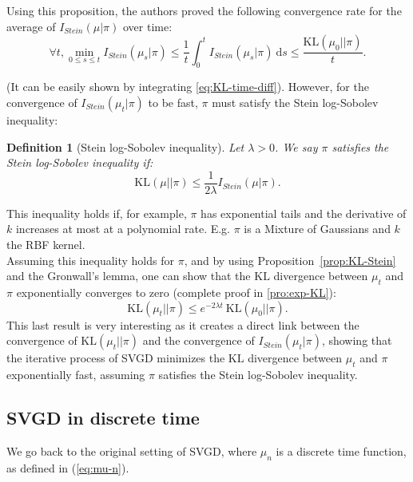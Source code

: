 \documentclass{article}
\newcommand{\KL}{\mathrm{KL}}
\renewcommand{\d}{\: \mathrm{d}}
\newcommand{\Stein}{I_{Stein}(\mu | \pi)}
\newtheorem{definition}{Definition}
\begin{document}
Using this proposition, the authors proved the following convergence rate
for the average of $\Stein$ over time:
\begin{equation}
  \forall t, \min_{0 \leq s \leq t} I_{Stein}(\mu_s | \pi)
    \leq \frac{1}{t} \int_0^t I_{Stein}(\mu_s | \pi) \d s
    \leq \frac{\KL(\mu_0 || \pi)}{t}.
  \label{eq:convergence-avg-stein}
\end{equation}

(It can be easily shown by integrating \ref{eq:KL-time-diff}).
However, for the convergence of $I_{Stein}(\mu_t | \pi)$ to be fast,
$\pi$ must satisfy the Stein log-Sobolev inequality:

\begin{definition}[Stein log-Sobolev inequality]\label{def:stein-log-Sobolev}
  Let $\lambda > 0$. We say $\pi$ satisfies the Stein log-Sobolev inequality if:
  $$
  \KL(\mu || \pi) \leq \frac{1}{2 \lambda} \Stein.
  $$
\end{definition}
\noindent
This inequality holds if, for example, $\pi$ has exponential tails and the derivative of $k$
increases at most at a polynomial rate. E.g. $\pi$ is a Mixture of Gaussians
and $k$ the RBF kernel.\\
Assuming this inequality holds for $\pi$, and by using Proposition~\ref{prop:KL-Stein}
and the Gronwall's lemma,
one can show that the $\KL$ divergence between $\mu_t$ and $\pi$ exponentially
converges to zero (complete proof in \ref{pro:exp-KL}):
\begin{equation}
  \KL(\mu_t || \pi) \leq e^{-2 \lambda t} \: \KL(\mu_0 || \pi).
  \label{eq:exp-KL}
\end{equation}
This last result is very interesting as it creates a direct link between the
convergence of $\KL(\mu_t || \pi)$ and the convergence
of $I_{Stein}(\mu_t | \pi)$, showing that the iterative process
of SVGD minimizes the $\KL$ divergence between $\mu_t$ and $\pi$ exponentially fast,
assuming $\pi$ satisfies the Stein log-Sobolev inequality.

\subsection{SVGD in discrete time}
We go back to the original setting of SVGD, where $\mu_n$ is a discrete
time function, as defined in (\ref{eq:mu-n}).\\
\end{document}
